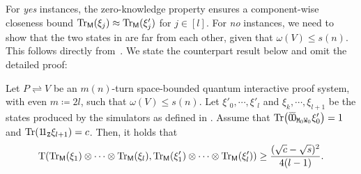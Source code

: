 \documentclass[11pt, a4paper]{article}
\numberwithin{equation}{section}
\numberwithin{figure}{section}
\newcommand{\protocol}[2]{{#1}\!\rightleftharpoons\!{#2}}
\DeclarePairedDelimiter\rbra{\lparen}{\rparen}
\let\ket\relax\DeclarePairedDelimiter\ket{\lvert}{\rangle}
\let\bra\relax\DeclarePairedDelimiter\bra{\langle}{\rvert}
\newcommand{\ketbra}[2]{\ensuremath{\ket{#1}\!\bra{#2}}}
\newcommand{\Tr}{\mathrm{Tr}}
\newcommand{\td}{\mathrm{T}}
\newcommand{\sfM}{\mathsf{M}}
\newcommand{\ttM}{\mathtt{M}}
\newcommand{\ttW}{\mathtt{W}}
\newcommand{\ttZ}{\mathtt{Z}}
\begin{document}
For \textit{yes} instances, the zero-knowledge property ensures a component-wise closeness bound $\Tr_{\sfM}\rbra*{\xi_j} \approx \Tr_{\sfM}(\xi'_j)$ for $j\in[l]$. 
For \textit{no} instances, we need to show that the two states in  are far from each other, given that $\omega(V) \leq s(n)$. This follows directly from~\cite[Lemma 15]{Wat02QSZK}. We state the counterpart result below and omit the detailed proof: 
\begin{proposition}
    \label{prop:QSZKLhard-soundness}
    Let $\protocol{P}{V}$ be an $m(n)$-turn space-bounded quantum interactive proof system, with even $m\coloneq 2l$, such that $\omega(V) \leq s(n)$. Let $\xi'_0,\cdots,\xi'_l$ and $\xi_k,\cdots,\xi_{l+1}$ be the states produced by the simulators as defined in . Assume that $\Tr\rbra*{\ketbra{\bar{0}}{\bar{0}}_{\ttM_0\ttW_0} \xi'_0} = 1$ and $\Tr\rbra*{\ketbra{1}{1}_{\ttZ} \xi_{l+1}} = c$. Then, it holds that
    \[ \td\rbra*{\Tr_{\sfM}(\xi_1)\otimes \cdots \otimes \Tr_{\sfM}(\xi_l), \Tr_{\sfM}\rbra*{\xi'_1}\otimes \cdots \otimes \Tr_{\sfM}\rbra*{\xi'_l}} \geq \frac{(\sqrt{c}-\sqrt{s})^2}{4(l-1)}.\]
\end{proposition}
\end{document}
